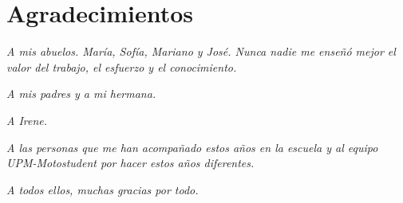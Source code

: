 \chapter{Agradecimientos}

\textit{A mis abuelos. María, Sofía, Mariano y José. Nunca nadie me enseñó mejor el valor del trabajo, el esfuerzo y el conocimiento.}

\textit{A mis padres y a mi hermana.}

\textit{A Irene.}

\textit{A las personas que me han acompañado estos años en la escuela y al equipo UPM-Motostudent por hacer estos años diferentes.}

\textit{A todos ellos, muchas gracias por todo.}